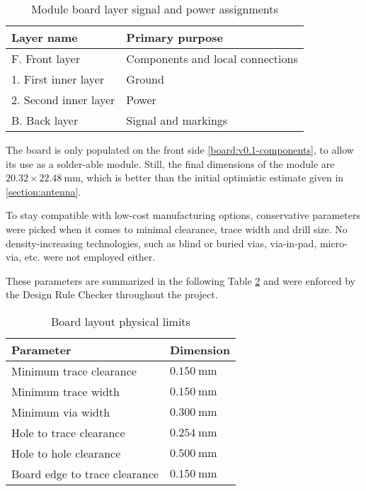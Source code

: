 \begin{table}[H]
\begin{center}
\caption{\label{table:board-layers}Module board layer signal and power assignments}
    \begin{tabular}{|l|l|} \hline
    \textbf{Layer name}     & \textbf{Primary purpose} \\ \hline
    F. Front layer          & Components and local connections \\ \hline
    1. First inner layer    & Ground \\ \hline
    2. Second inner layer   & Power \\ \hline
    B. Back layer           & Signal and markings \\ \hline
    \end{tabular}
\end{center}
\end{table}

The board is only populated on the front side \ref{board:v0.1-components}, to allow its use as a solder-able module. Still, the final dimensions of the module are $20.32 \times 22.48~\mathrm{mm}$, which is better than the initial optimistic estimate given in \ref{section:antenna}.

To stay compatible with low-cost manufacturing options, conservative parameters were picked when it comes to minimal clearance, trace width and drill size. No density-increasing technologies, such as blind or buried vias, via-in-pad, micro-via, etc. were not employed either. 

These parameters are summarized in the following Table \ref{table:board-limits} and were enforced by the Design Rule Checker throughout the project.

\begin{table}[H]
\begin{center}
\caption{\label{table:board-limits}Board layout physical limits}
    \begin{tabular}{|l|l|} \hline
    \textbf{Parameter}          & \textbf{Dimension} \\ \hline
    Minimum trace clearance & $0.150~\mathrm{mm}$ \\ \hline
    Minimum trace width & $0.150~\mathrm{mm}$ \\ \hline
    Minimum via width & $0.300~\mathrm{mm}$ \\ \hline
    Hole to trace clearance & $0.254~\mathrm{mm}$ \\ \hline
    Hole to hole clearance & $0.500~\mathrm{mm}$ \\ \hline
    Board edge to trace clearance & $0.150~\mathrm{mm}$ \\ \hline
    \end{tabular}
\end{center}
\end{table}

